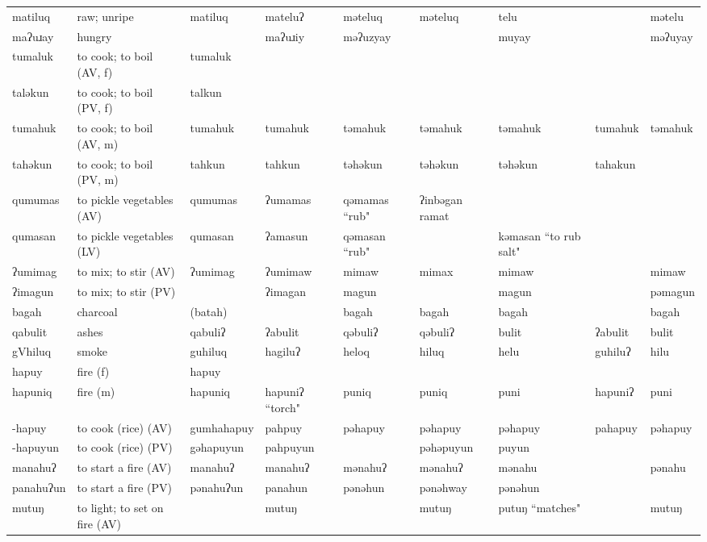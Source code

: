 \begin{landscape}
\begin{longtable}{*{9}{>{\raggedright\arraybackslash}p{}}}
\text{*}matiluq & raw; unripe & matiluq & mateluʔ & məteluq & məteluq & telu &  & mətelu\\
\text{*}maʔuɹay & hungry &  & maʔuɹiy & məʔuzyay &  & muyay &  & məʔuyay\\
\text{*}tumaluk & to cook; to boil (AV, f) & tumaluk &  &  &  &  &  & \\
\text{*}taləkun & to cook; to boil (PV, f) & talkun &  &  &  &  &  & \\
\text{*}tumahuk & to cook; to boil (AV, m) & tumahuk & tumahuk & təmahuk & təmahuk & təmahuk & tumahuk & təmahuk\\
\text{*}tahəkun & to cook; to boil (PV, m) & tahkun & tahkun & təhəkun & təhəkun & təhəkun & tahakun & \\
\text{*}qumumas & to pickle vegetables (AV) & qumumas & ʔumamas & qəmamas ``rub" & ʔinbəgan ramat &  &  & \\
\text{*}qumasan & to pickle vegetables (LV) & qumasan & ʔamasun & qəmasan ``rub" &  & kəmasan \newline ``to rub salt" &  & \\
\text{*}ʔumimag & to mix; to stir (AV) & ʔumimag & ʔumimaw & mimaw & mimax & mimaw &  & mimaw\\
\text{*}ʔimagun & to mix; to stir (PV) &  & ʔimagan & magun &  & magun &  & pəmagun\\
\text{*}bagah & charcoal & (batah) &  & bagah & bagah & bagah &  & bagah\\
\text{*}qabulit & ashes & qabuliʔ & ʔabulit & qəbuliʔ & qəbuliʔ & bulit & ʔabulit & bulit\\
\text{*}gVhiluq & smoke & guhiluq & hagiluʔ & heloq & hiluq & helu & guhiluʔ & hilu\\
\text{*}hapuy & fire (f) & hapuy &  &  &  &  &  & \\
\text{*}hapuniq & fire (m) & hapuniq & hapuniʔ ``torch" & puniq & puniq & puni & hapuniʔ & puni\\
\text{*}-hapuy & to cook (rice) (AV) & gumhahapuy & pahpuy & pəhapuy & pəhapuy & pəhapuy & pahapuy & pəhapuy\\
\text{*}-hapuyun & to cook (rice) (PV) & gəhapuyun & pahpuyun &  & pəhəpuyun & puyun &  & \\
\text{*}manahuʔ & to start a fire (AV) & manahuʔ & manahuʔ & mənahuʔ & mənahuʔ & mənahu &  & pənahu\\
\text{*}panahuʔun & to start a fire (PV) & pənahuʔun & panahun & pənəhun & pənəhway & pənəhun &  & \\
\text{*}mutuŋ & to light; to set on fire (AV) &  & mutuŋ &  & mutuŋ & putuŋ ``matches" &  & mutuŋ\\

\end{longtable}
\end{landscape}
